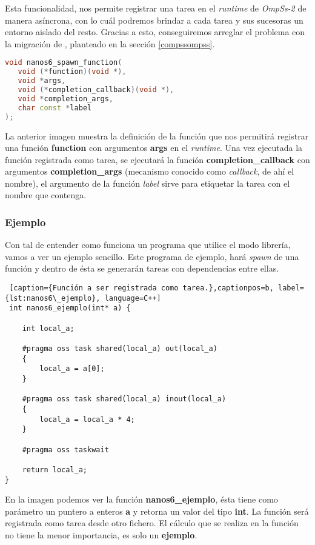 Esta funcionalidad, nos permite registrar una tarea en el \textit{runtime} de \textit{OmpSs-2} de manera asíncrona, con lo cuál podremos brindar a cada tarea y sus sucesoras un entorno aislado del resto. Gracias a esto, conseguiremos arreglar el problema con la migración de , planteado en la sección \ref{compssompss}. \smallskip

\begin{lstlisting}[caption={Definición de la función nanos6\_spawn\_function.},captionpos=b, label={lst:nanos6spawn}, language=C++]
void nanos6_spawn_function(
   void (*function)(void *), 
   void *args,
   void (*completion_callback)(void *), 
   void *completion_args, 
   char const *label
);
\end{lstlisting}

La anterior imagen muestra la definición de la función que nos permitirá registrar una función \textbf{function} con argumentos \textbf{args} en el \textit{runtime}. Una vez ejecutada la función registrada como tarea, se ejecutará la función \textbf{completion\_callback} con argumentos \textbf{completion\_args} (mecanismo conocido como \textit{callback}, de ahí el nombre), el argumento de la función \textit{label} sirve para etiquetar la tarea con el nombre que contenga.

\subsubsection{Ejemplo}

Con tal de entender como funciona un programa que utilice el modo librería, vamos a ver un ejemplo sencillo. Este programa de ejemplo, hará \textit{spawn} de una función y dentro de ésta se generarán tareas con dependencias entre ellas. \smallskip

\begin{lstlisting} [caption={Función a ser registrada como tarea.},captionpos=b, label={lst:nanos6\_ejemplo}, language=C++]
 int nanos6_ejemplo(int* a) {

    int local_a;

    #pragma oss task shared(local_a) out(local_a) 
    {
        local_a = a[0];
    }

    #pragma oss task shared(local_a) inout(local_a)
    {
        local_a = local_a * 4;
    }

    #pragma oss taskwait

    return local_a;
}
\end{lstlisting}

En la imagen podemos ver la función \textbf{nanos6\_ejemplo}, ésta tiene como parámetro un puntero a enteros \textbf{a} y retorna un valor del tipo \textbf{int}. La función será registrada como tarea desde otro fichero. El cálculo que se realiza en la función no tiene la menor importancia, es solo un \textbf{ejemplo}. \medskip


